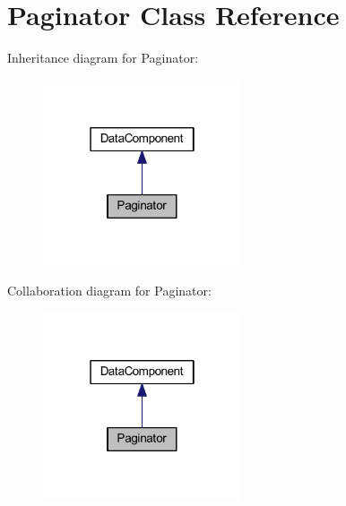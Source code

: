 \hypertarget{classhamburgscleanest_1_1_data_tables_1_1_models_1_1_data_components_1_1_paginator}{}\section{Paginator Class Reference}
\label{classhamburgscleanest_1_1_data_tables_1_1_models_1_1_data_components_1_1_paginator}


Inheritance diagram for Paginator\+:\nopagebreak
\begin{figure}[H]
\begin{center}
\leavevmode
\includegraphics[width=166pt]{classhamburgscleanest_1_1_data_tables_1_1_models_1_1_data_components_1_1_paginator__inherit__graph}
\end{center}
\end{figure}


Collaboration diagram for Paginator\+:\nopagebreak
\begin{figure}[H]
\begin{center}
\leavevmode
\includegraphics[width=166pt]{classhamburgscleanest_1_1_data_tables_1_1_models_1_1_data_components_1_1_paginator__coll__graph}
\end{center}
\end{figure}
